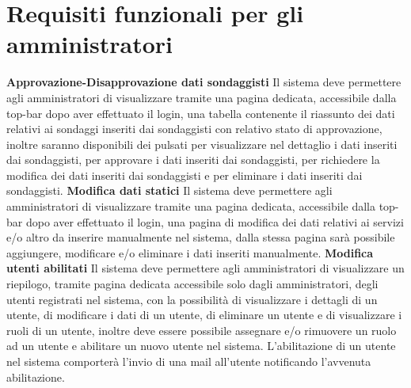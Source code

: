     \section{Requisiti funzionali per gli amministratori}
        \begin{rfList}
            \rfItem \textbf{Approvazione-Disapprovazione dati sondaggisti } Il sistema deve permettere agli amministratori di visualizzare tramite una pagina dedicata, accessibile dalla top-bar dopo aver effettuato il login, una tabella contenente il riassunto dei dati relativi ai sondaggi inseriti dai sondaggisti con relativo stato di approvazione, inoltre saranno disponibili dei pulsati per visualizzare nel dettaglio i dati inseriti dai sondaggisti, per approvare i dati inseriti dai sondaggisti, per richiedere la modifica dei dati inseriti dai sondaggisti e per eliminare i dati inseriti dai sondaggisti.
            \rfItem \textbf{Modifica dati statici} Il sistema deve permettere agli amministratori di visualizzare tramite una pagina dedicata, accessibile dalla top-bar dopo aver effettuato il login, una pagina di modifica dei dati relativi ai servizi e/o altro da inserire manualmente nel sistema, dalla stessa pagina sarà possibile aggiungere, modificare e/o eliminare i dati inseriti manualmente.
            \rfItem \textbf{Modifica utenti abilitati} Il sistema deve permettere agli amministratori di visualizzare un riepilogo, tramite pagina dedicata accessibile solo dagli amministratori, degli utenti registrati nel sistema, con la possibilità di visualizzare i dettagli di un utente, di modificare i dati di un utente, di eliminare un utente e di visualizzare i ruoli di un utente, inoltre deve essere possibile assegnare e/o rimuovere un ruolo ad un utente e abilitare un nuovo utente nel sistema. L'abilitazione di un utente nel sistema comporterà l'invio di una mail all'utente notificando l'avvenuta abilitazione.
        \end{rfList}